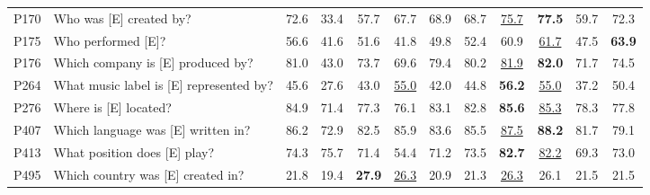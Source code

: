\documentclass[letterpaper]{article} \usepackage{aaai23}  \usepackage{times}  \usepackage{helvet}  \usepackage{courier}  \usepackage[hyphens]{url}  \usepackage{graphicx} \urlstyle{rm} \def\UrlFont{\rm}  \usepackage{natbib}  \usepackage{caption} \frenchspacing  \setlength{\pdfpagewidth}{8.5in}  \setlength{\pdfpageheight}{11in}  \usepackage{algorithm}
\begin{document}
\begin{table*}
{\begin{tabular}{llcccccccccc}
			P170                                                  & Who was [E] created by?                 & 72.6             & 33.4            & 57.7               & 67.7             & 68.9                         & 68.7                        & \underline{75.7}   & \textbf{77.5}     & 59.7                & 72.3                     \\
			P175                                                  & Who performed [E]?                      & 56.6             & 41.6            & 51.6               & 41.8             & 49.8                         & 52.4                        & 60.9               & \underline{	61.7 	} & 47.5                & \textbf{63.9}            \\
			P176                                                  & Which company is [E] produced by?       & 81.0             & 43.0            & 73.7               & 69.6             & 79.4                         & 80.2                        & \underline{81.9}   & \textbf{82.0}     & 71.7                & 74.5                     \\
			P264                                                  & What music label is [E] represented by? & 45.6             & 27.6            & 43.0               & \underline{55.0} & 42.0                         & 44.8                        & \textbf{56.2}      & \underline{55.0}  & 37.2                & 50.4                     \\
			P276                                                  & Where is [E] located?                   & 84.9             & 71.4            & 77.3               & 76.1             & 83.1                         & 82.8                        & \textbf{85.6}      & \underline{85.3}  & 78.3                & 77.8                     \\
			P407                                                  & Which language was [E] written in?      & 86.2             & 72.9            & 82.5               & 85.9             & 83.6                         & 85.5                        & \underline{87.5}   & \textbf{88.2}     & 81.7                & 79.1                     \\
			P413                                                  & What position does [E] play?            & 74.3             & 75.7            & 71.4               & 54.4             & 71.2                         & 73.5                        & \textbf{82.7}      & \underline{82.2}  & 69.3                & 73.0                     \\
			P495                                                  & Which country was [E] created in?       & 21.8             & 19.4            & \textbf{27.9}      & \underline{26.3} & 20.9                         & 21.3                        & \underline{26.3}   & 26.1              & 21.5                & 21.5                     \\

\end{tabular}}
\end{table*}
\end{document}
